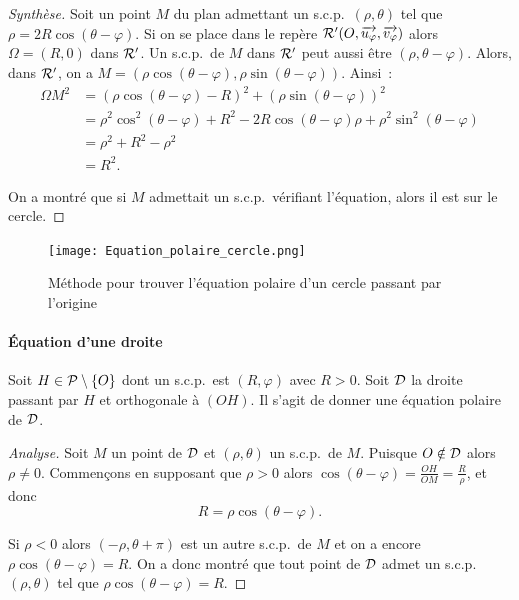 \begin{proof}[Synthèse]
  Soit un point \(M\) du plan admettant un s.c.p.\ \((\rho , \theta)\) tel que 
  \(\rho = 2R\cos(\theta - \varphi)\). Si on se place dans le repère \(\Rep' (O 
  , \vect{u_\varphi}, \vect{v_\varphi})\) alors \(\Omega =(R , 0)\) dans 
  \(\Rep'\). Un s.c.p.\ de \(M\) dans \(\Rep'\) peut aussi être \((\rho , \theta 
  - \varphi)\). Alors, dans \(\Rep'\), on a \(M = (\rho \cos(\theta - \varphi), 
  \rho \sin(\theta - \varphi))\). Ainsi~:
  \begin{align}
    {\Omega M}^2& = (\rho\cos(\theta - \varphi)-R)^2 + (\rho\sin(\theta - 
    \varphi))^2 \\
                &= \rho^2 \cos^2(\theta - \varphi) + R^2 - 2R\cos(\theta - 
                \varphi)\rho + \rho^2 \sin^2(\theta - \varphi) \\
                &= \rho^2 + R^2 - \rho^2\\
                &= R^2.
  \end{align}

  On a montré que si \(M\) admettait un s.c.p.\ vérifiant l'équation, alors il 
  est sur le cercle.
\end{proof}

\begin{figure}
  \centering
  \texttt{[image: Equation\_polaire\_cercle.png]}
  \caption{Méthode pour trouver l'équation polaire d'un cercle passant par 
  l'origine}
  \label{fig:cerclepolaire}
\end{figure}

\paragraph{Équation d'une droite}
\label{par:eqdroite}

Soit \(H \in \P\setminus\{O\}\) dont un s.c.p.\ est \((R , \varphi)\) avec 
\(R>0\). Soit \(\Dr\) la droite passant par \(H\) et orthogonale à \((OH)\). Il 
s'agit de donner une équation polaire de \(\Dr\).

\begin{proof}[Analyse]
  Soit \(M\) un point de \(\Dr\) et \((\rho , \theta)\) un s.c.p.\ de \(M\).  
  Puisque \(O \notin \Dr\) alors \(\rho \neq 0\). Commençons en supposant que 
  \(\rho>0\) alors \(\cos(\theta - \varphi) = \frac{OH}{OM} = \frac{R}{\rho}\),
  et donc 
  \begin{equation}
    R = \rho \cos(\theta - \varphi). 
  \end{equation}

  Si \(\rho<0\) alors \((-\rho , \theta + \pi)\) est un autre s.c.p.\ de \(M\) 
  et on a encore \(\rho\cos(\theta - \varphi) = R\). On a donc montré que tout 
  point de \(\Dr\) admet un s.c.p.\ \((\rho, \theta)\) tel que \(\rho\cos(\theta 
  - \varphi) = R\).
\end{proof}

